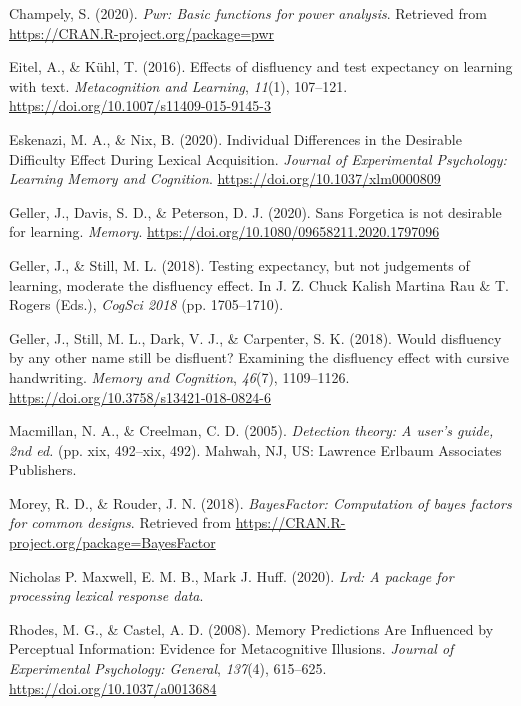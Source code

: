 \documentclass[
  english,
  jou]{apa6}
\begin{document}
\leavevmode\hypertarget{ref-Champely2020}{}%
Champely, S. (2020). \emph{Pwr: Basic functions for power analysis}. Retrieved from \url{https://CRAN.R-project.org/package=pwr}

\leavevmode\hypertarget{ref-Eitel2016}{}%
Eitel, A., \& Kühl, T. (2016). Effects of disfluency and test expectancy on learning with text. \emph{Metacognition and Learning}, \emph{11}(1), 107--121. \url{https://doi.org/10.1007/s11409-015-9145-3}

\leavevmode\hypertarget{ref-Eskenazi2020}{}%
Eskenazi, M. A., \& Nix, B. (2020). Individual Differences in the Desirable Difficulty Effect During Lexical Acquisition. \emph{Journal of Experimental Psychology: Learning Memory and Cognition}. \url{https://doi.org/10.1037/xlm0000809}

\leavevmode\hypertarget{ref-Geller2020}{}%
Geller, J., Davis, S. D., \& Peterson, D. J. (2020). Sans Forgetica is not desirable for learning. \emph{Memory}. \url{https://doi.org/10.1080/09658211.2020.1797096}

\leavevmode\hypertarget{ref-cogsci18-Geller}{}%
Geller, J., \& Still, M. L. (2018). Testing expectancy, but not judgements of learning, moderate the disfluency effect. In J. Z. Chuck Kalish Martina Rau \& T. Rogers (Eds.), \emph{CogSci 2018} (pp. 1705--1710).

\leavevmode\hypertarget{ref-Geller2018}{}%
Geller, J., Still, M. L., Dark, V. J., \& Carpenter, S. K. (2018). Would disfluency by any other name still be disfluent? Examining the disfluency effect with cursive handwriting. \emph{Memory and Cognition}, \emph{46}(7), 1109--1126. \url{https://doi.org/10.3758/s13421-018-0824-6}

\leavevmode\hypertarget{ref-Macmillan2005}{}%
Macmillan, N. A., \& Creelman, C. D. (2005). \emph{Detection theory: A user's guide, 2nd ed.} (pp. xix, 492--xix, 492). Mahwah, NJ, US: Lawrence Erlbaum Associates Publishers.

\leavevmode\hypertarget{ref-Morey2018}{}%
Morey, R. D., \& Rouder, J. N. (2018). \emph{BayesFactor: Computation of bayes factors for common designs}. Retrieved from \url{https://CRAN.R-project.org/package=BayesFactor}

\leavevmode\hypertarget{ref-Maxwell2020}{}%
Nicholas P. Maxwell, E. M. B., Mark J. Huff. (2020). \emph{Lrd: A package for processing lexical response data}.

\leavevmode\hypertarget{ref-Rhodes2008}{}%
Rhodes, M. G., \& Castel, A. D. (2008). Memory Predictions Are Influenced by Perceptual Information: Evidence for Metacognitive Illusions. \emph{Journal of Experimental Psychology: General}, \emph{137}(4), 615--625. \url{https://doi.org/10.1037/a0013684}
\end{document}
